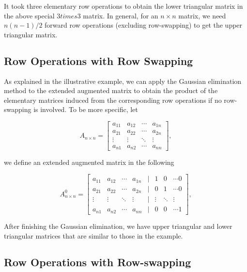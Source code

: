 \documentclass[
]{book}
\begin{document}
It took three elementary row operations to obtain the lower triangular matrix in the above special \(3times 3\) matrix. In general, for an \(n\times n\) matrix, we need \(n(n-1)/2\) forward row operations (excluding row-swapping) to get the upper triangular matrix.

\hfill\break

\hypertarget{row-operations-with-row-swapping}{%
\subsection{Row Operations with Row Swapping}\label{row-operations-with-row-swapping}}

As explained in the illustrative example, we can apply the Gaussian elimination method to the extended augmented matrix to obtain the product of the elementary matrices induced from the corresponding row operations if no row-swapping is involved. To be more specific, let

\[
A_{n\times n} = \left[\begin{array}{ccccc} 
a_{11} & a_{12} & \cdots & a_{1n}  \\ 
a_{21} & a_{22} & \cdots & a_{2n}  \\ 
\vdots & \vdots & \ddots & \vdots  \\
a_{n1} & a_{n2} & \cdots & a_{nn}  
\end{array}
\right],
\]

we define an extended augmented matrix in the following

\[
A^0_{n\times n} = \left[\begin{array}{ccccccccc} 
a_{11} & a_{12} & \cdots & a_{1n} & | & 1 & 0 & \cdots 0 \\ 
a_{21} & a_{22} & \cdots & a_{2n} & | & 0 & 1 & \cdots 0 \\ 
\vdots & \vdots & \ddots & \vdots & | & \vdots & \ddots & \vdots \\
a_{n1} & a_{n2} & \cdots & a_{nn} & | & 0 & 0 & \cdots 1   
\end{array}
\right],
\]

After finishing the Gaussian elimination, we have upper triangular and lower triangular matrices that are similar to those in the example.

\hfill\break

\hypertarget{row-operations-with-row-swapping-1}{%
\subsection{Row Operations with Row-swapping}\label{row-operations-with-row-swapping-1}}
\end{document}
